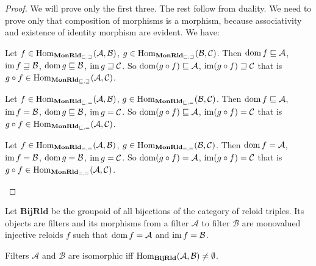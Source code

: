 \begin{proof}
We will prove only the first three. The rest follow from duality.
We need to prove only that composition of morphisms is a morphism,
because associativity and existence of identity morphism are evident.
We have:
\begin{widedisorder}
\item [{\ref{monrld-le-ge}}] Let $f\in\operatorname{Hom}_{\mathbf{MonRld}_{\sqsubseteq,\sqsupseteq}}(\mathcal{A},\mathcal{B})$,
$g\in\operatorname{Hom}_{\mathbf{MonRld}_{\sqsubseteq,\sqsupseteq}}(\mathcal{B},\mathcal{C})$.
Then $\operatorname{dom} f\sqsubseteq\mathcal{A}$, $\operatorname{im} f\sqsupseteq\mathcal{B}$,
$\operatorname{dom} g\sqsubseteq\mathcal{B}$, $\operatorname{im} g\sqsupseteq\mathcal{C}$. So
$\operatorname{dom}(g\circ f)\sqsubseteq\mathcal{A}$, $\operatorname{im}(g\circ f)\sqsupseteq\mathcal{C}$
that is $g\circ f\in\operatorname{Hom}_{\mathbf{MonRld}_{\sqsubseteq,\sqsupseteq}}(\mathcal{A},\mathcal{C})$.
\item [{\ref{monrld-le-eq}}] Let $f\in\operatorname{Hom}_{\mathbf{MonRld}_{\sqsubseteq,=}}(\mathcal{A},\mathcal{B})$,
$g\in\operatorname{Hom}_{\mathbf{MonRld}_{\sqsubseteq,=}}(\mathcal{B},\mathcal{C})$.
Then $\operatorname{dom} f\sqsubseteq\mathcal{A}$, $\operatorname{im} f=\mathcal{B}$, $\operatorname{dom} g\sqsubseteq\mathcal{B}$,
$\operatorname{im} g=\mathcal{C}$. So $\operatorname{dom}(g\circ f)\sqsubseteq\mathcal{A}$,
$\operatorname{im}(g\circ f)=\mathcal{C}$ that is $g\circ f\in\operatorname{Hom}_{\mathbf{MonRld}_{\sqsubseteq,=}}(\mathcal{A},\mathcal{C})$.
\item [{\ref{monrld-eq-eq}}] Let $f\in\operatorname{Hom}_{\mathbf{MonRld}_{=,=}}(\mathcal{A},\mathcal{B})$,
$g\in\operatorname{Hom}_{\mathbf{MonRld}_{=,=}}(\mathcal{B},\mathcal{C})$. Then
$\operatorname{dom} f=\mathcal{A}$, $\operatorname{im} f=\mathcal{B}$, $\operatorname{dom} g=\mathcal{B}$,
$\operatorname{im} g=\mathcal{C}$. So $\operatorname{dom}(g\circ f)=\mathcal{A}$, $\operatorname{im}(g\circ f)=\mathcal{C}$
that is $g\circ f\in\operatorname{Hom}_{\mathbf{MonRld}_{=,=}}(\mathcal{A},\mathcal{C})$.
\end{widedisorder}
\end{proof}
\begin{defn}
Let $\mathbf{BijRld}$ be the groupoid of all bijections of the category
of reloid triples. Its objects are filters and its morphisms from
a filter $\mathcal{A}$ to filter $\mathcal{B}$ are monovalued injective
reloids $f$ such that $\operatorname{dom} f=\mathcal{A}$ and $\operatorname{im} f=\mathcal{B}$.\end{defn}
\begin{thm}
Filters $\mathcal{A}$ and $\mathcal{B}$ are isomorphic iff $\operatorname{Hom}_{\mathbf{BijRld}}(\mathcal{A},\mathcal{B})\neq\emptyset$.\end{thm}
